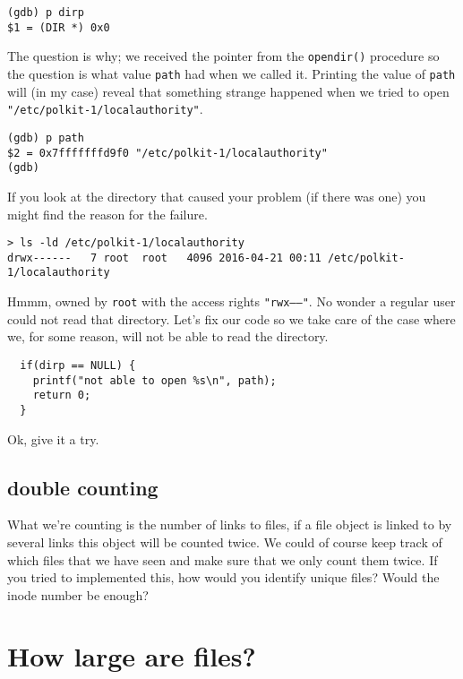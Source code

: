 \documentclass[a4paper,11pt]{article}
\begin{document}
\begin{verbatim}
(gdb) p dirp
$1 = (DIR *) 0x0
\end{verbatim}

The question is why; we received the pointer from the {\tt opendir()}
procedure so the question is what value {\tt path} had when we called
it. Printing the value of {\tt path} will (in my case) reveal that
something strange happened when we tried to open {\tt
  "/etc/polkit-1/localauthority"}.

\begin{verbatim}
(gdb) p path
$2 = 0x7fffffffd9f0 "/etc/polkit-1/localauthority"
(gdb) 
\end{verbatim}

If you look at the directory that caused your problem (if there was
one) you might find the reason for the failure.

\begin{verbatim}
> ls -ld /etc/polkit-1/localauthority
drwx------   7 root  root   4096 2016-04-21 00:11 /etc/polkit-1/localauthority
\end{verbatim}

Hmmm, owned by {\tt root} with the access rights {\tt "rwx------"}.
No wonder a regular user could not read that directory. Let's fix our
code so we take care of the case where we, for some reason, will not
be able to read the directory.

\begin{lstlisting}
  if(dirp == NULL) {
    printf("not able to open %s\n", path);
    return 0;
  }
\end{lstlisting}

Ok, give it a try. 

\subsection{double counting}

What we're counting is the number of links to files, if a file object is
linked to by several links this object will be counted twice. We could
of course keep track of which files that we have seen and make sure
that we only count them twice. If you tried to implemented this, how
would you identify unique files? Would the inode number be enough?

\section{How large are files?}
\end{document}

